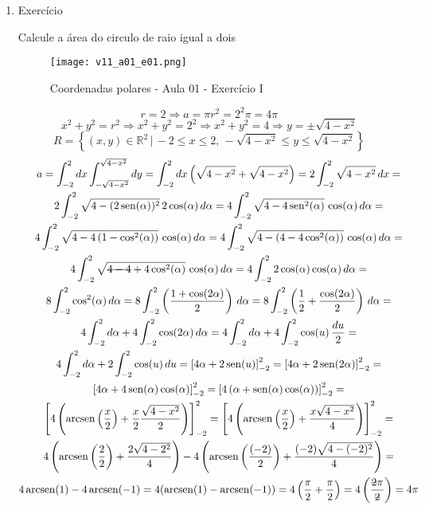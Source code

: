 \begin{enumerate}
	\item Exercício
	
	Calcule a área do circulo de raio igual a dois
	
	\begin{figure}[htb]
		\caption{Coordenadas polares - Aula 01 - Exercício I}
		\label{v11_a01_e01}
		\centering
		\texttt{[image: v11\_a01\_e01.png]}		
	\end{figure}
	
	\begin{equation*}
		r = 2 \Rightarrow a = \pi r^2 = 2^2 \pi = 4\pi	
	\end{equation*}
	\begin{equation*}
		x^2 + y^2 = r^2 \Rightarrow x^2 + y^2 = 2^2 \Rightarrow x^2 + y^2 = 4 \Rightarrow y = \pm\sqrt{4 - x^2}
	\end{equation*}	
	\begin{equation*}
		R = \left\{(x, y) \in \mathbb{R}^2 \,|\, -2 \leq x \leq 2,\, -\sqrt{4 - x^2} \leq y \leq \sqrt{4 - x^2} \right\}
	\end{equation*}
	\begin{gather*}
		a = \int_{-2}^2 dx \int_{-\sqrt{4 - x^2}}^{\sqrt{4 - x^2}} dy = \int_{-2}^2 dx \left(\sqrt{4 - x^2} + \sqrt{4 - x^2}\right) = 2\int_{-2}^2 \sqrt{4 - x^2}\, dx =\\ 2\int_{-2}^2 \sqrt{4 - (2\sen(\alpha))^2}\, 2\cos(\alpha)\,d\alpha = 4\int_{-2}^2 \sqrt{4 - 4\sen^2(\alpha)}\, \cos(\alpha)\,d\alpha =\\ 4\int_{-2}^2 \sqrt{4 - 4\left(1 - \cos^2(\alpha)\right)}\, \cos(\alpha)\,d\alpha = 4\int_{-2}^2 \sqrt{4 - \left(4 - 4\cos^2(\alpha)\right)}\, \cos(\alpha)\,d\alpha =\\ 4\int_{-2}^2 \sqrt{\overstrike{4 - 4} + 4\cos^2(\alpha)}\, \cos(\alpha)\,d\alpha = 4\int_{-2}^2 2\cos(\alpha)\cos(\alpha)\,d\alpha =\\ 8\int_{-2}^2 \cos^2(\alpha)\,d\alpha = 8\int_{-2}^2 \left(\dfrac{1 + \cos(2\alpha)}{2}\right)\,d\alpha = 8\int_{-2}^2 \left(\dfrac{1}{2} + \dfrac{\cos(2\alpha)}{2}\right)\,d\alpha =\\ 4\int_{-2}^2 d\alpha + 4\int_{-2}^2 \cos(2\alpha)\, d\alpha = 4\int_{-2}^2 d\alpha + 4\int_{-2}^2 \cos(u)\, \dfrac{du}{2} =\\ 4\int_{-2}^2 d\alpha + 2\int_{-2}^2 \cos(u)\, du = \left[4\alpha + 2 \sen(u)\right]_{-2}^2 = \left[4\alpha + 2 \sen(2\alpha)\right]_{-2}^2 =\\ \left[4\alpha + 4 \sen(\alpha)\cos(\alpha)\right]_{-2}^2 = \left[4\left(\alpha + \sen(\alpha)\cos(\alpha)\right)\right]_{-2}^2 =\\ \left[4\left(\arcsen\left(\dfrac{x}{2}\right) + \dfrac{x}{2}\dfrac{\sqrt{4 - x^2}}{2}\right)\right]_{-2}^2 = \left[4\left(\arcsen\left(\dfrac{x}{2}\right) + \dfrac{x\sqrt{4 - x^2}}{4}\right)\right]_{-2}^2 =\\ 4\left(\arcsen\left(\dfrac{2}{2}\right) + \dfrac{2\sqrt{4 - 2^2}}{4}\right) - 4\left(\arcsen\left(\dfrac{(-2)}{2}\right) + \dfrac{(-2)\sqrt{4 - (-2)^2}}{4}\right) =\\ 4\arcsen(1) - 4\arcsen(-1) =  4(\arcsen(1) - \arcsen(-1)) = 4\left(\dfrac{\pi}{2} + \dfrac{\pi}{2}\right) = 4\left(\dfrac{\overstrike{2}\pi}{\overstrike{2}}\right) = 4\pi

\end{gather*}
\end{enumerate}
